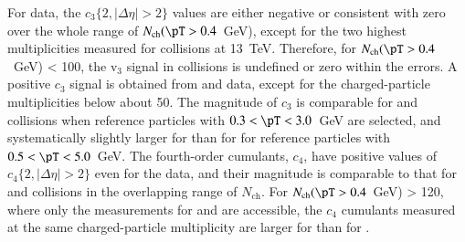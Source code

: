 \documentclass[cernpreprint,texlive=2014,txfonts,UKenglish]{latex/atlasdoc}
\begin{document}
For \pp data, the $c_3\{2,|\Delta\eta|>2\}$ values are either negative or consistent with zero over the whole range of $N_{\mathrm{ch}}(\pT > 0.4$~GeV), except for the two highest multiplicities measured for \pp collisions at 13~TeV. Therefore, for  $N_{\mathrm{ch}}(\pT > 0.4$~GeV) < 100, the $\mathrm{v}_3$ signal in \pp collisions is undefined or zero within the errors. A positive $c_3$ signal is obtained from \pPb and \PbPb data, except for the charged-particle multiplicities below about 50. The magnitude of $c_3$ is comparable for \PbPb and \pPb collisions when reference particles with  $0.3< \pT < 3.0$~GeV are selected, and systematically slightly larger for \PbPb than for \pPb for reference particles with $0.5< \pT < 5.0$~GeV.  The fourth-order cumulants, $c_4$, have positive values of $c_4\{2,|\Delta\eta|>2\}$ even for the \pp data, and their  magnitude  is comparable to that for \pPb and \PbPb collisions in the overlapping range of  $N_{\mathrm{ch}}$. For  $N_{\mathrm{ch}}(\pT > 0.4$~GeV) > 120, where only the measurements for \pPb and \PbPb are accessible, the $c_4$ cumulants measured at the same charged-particle multiplicity are larger for \PbPb than for \pPb.  
\end{document}

